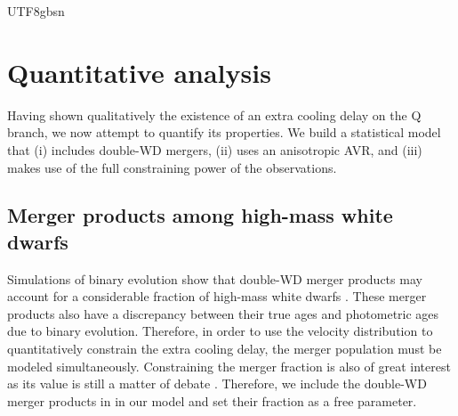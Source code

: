 \documentclass[twocolumn, times, trackchanges]{aastex63_bren}
\begin{document}
\begin{CJK*}{UTF8}{gbsn}
\section{Quantitative analysis}
\label{sec:quantitative inference}

Having shown qualitatively the existence of an extra cooling delay on the Q branch, we now attempt to quantify its properties. We build a statistical model that
(i) includes double-WD mergers, (ii) uses an anisotropic AVR, and (iii) makes use of the full constraining power of the observations. 


\subsection{Merger products among high-mass white dwarfs}
\label{sec:double WD merger products}

Simulations of binary evolution show that double-WD merger products may account for a considerable fraction of high-mass white dwarfs \citep[e.g.,][]{Toonen_2017, Temmink_2019}. These merger products also have a discrepancy between their true ages and photometric ages due to binary evolution. Therefore, in order to use the velocity distribution to quantitatively constrain the extra cooling delay, the merger population must be modeled simultaneously. Constraining the merger fraction is also of great interest as its value is still a matter of debate \citep[e.g.,][]{Giammichele_2012, Wegg_2012, Rebassa-Mansergas_2015, Tremblay_2016, Maoz_2018}. Therefore, we include the double-WD merger products in in our model and set their fraction as a free parameter.
\\
\\


\end{CJK*}
\end{document}
